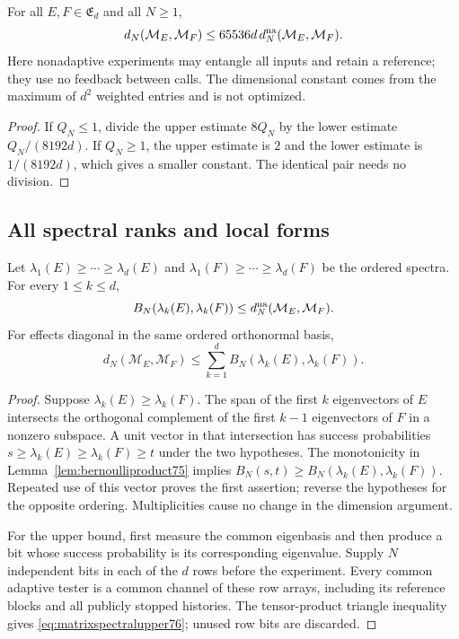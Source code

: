\begin{corollary}
\label{cor:matrixadaptivity76}
For all $E,F\in\mathfrak E_d$ and all $N\ge1$,
\begin{equation}\label{eq:matrixadaptivity76}
 d_N(\mathcal M_E,\mathcal M_F)
           \le65536d\,d_N^{\rm na}(\mathcal M_E,\mathcal M_F).
\end{equation}
Here nonadaptive experiments may entangle all inputs and retain a
reference; they use no feedback between calls. The dimensional constant
comes from the maximum of $d^2$ weighted entries and is not optimized.
\end{corollary}
\begin{proof}
If $Q_N\le1$, divide the upper estimate $8Q_N$ by the lower
estimate $Q_N/(8192d)$.  If $Q_N\ge1$, the upper estimate is
$2$ and the lower estimate is $1/(8192d)$, which gives a smaller
constant.  The identical pair needs no division.
\end{proof}

\subsection{All spectral ranks and local forms}

\begin{lemma}
\label{lem:matrixspectral76}
Let $\lambda_1(E)\ge\cdots\ge\lambda_d(E)$ and
$\lambda_1(F)\ge\cdots\ge\lambda_d(F)$ be the ordered spectra.
For every $1\le k\le d$,
\begin{equation}\label{eq:matrixspectrallower76}
 B_N(\lambda_k(E),\lambda_k(F))
                   \le d_N^{\rm na}(\mathcal M_E,\mathcal M_F).
\end{equation}
For effects diagonal in the same ordered orthonormal basis,
\begin{equation}\label{eq:matrixspectralupper76}
 d_N(\mathcal M_E,\mathcal M_F)
       \le\sum_{k=1}^d B_N(\lambda_k(E),\lambda_k(F)).
\end{equation}
\end{lemma}
\begin{proof}
Suppose $\lambda_k(E)\ge\lambda_k(F)$.  The span of the first
$k$ eigenvectors of $E$ intersects the orthogonal complement of
the first $k-1$ eigenvectors of $F$ in a nonzero subspace.  A unit
vector in that intersection has success probabilities
$s\ge\lambda_k(E)\ge\lambda_k(F)\ge t$ under the two
hypotheses.  The monotonicity in
Lemma~\ref{lem:bernoulliproduct75} implies
$B_N(s,t)\ge B_N(\lambda_k(E),\lambda_k(F))$.
Repeated use of this vector proves the first assertion; reverse
the hypotheses for the opposite ordering.  Multiplicities cause
no change in the dimension argument.

For the upper bound, first measure the common eigenbasis and then
produce a bit whose success probability is its corresponding
eigenvalue.  Supply $N$ independent bits in each of the $d$ rows
before the experiment.  Every common adaptive tester is a common
channel of these row arrays, including its reference blocks and
all publicly stopped histories.  The tensor-product triangle
inequality gives \eqref{eq:matrixspectralupper76}; unused row
bits are discarded.
\end{proof}

